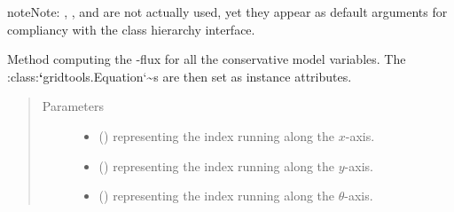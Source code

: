 \documentclass[letterpaper,10pt,english]{sphinxmanual}
\begin{document}
\begin{fulllineitems}
\begin{fulllineitems}
\begin{quote}
\begin{description}
\begin{itemize}
\end{itemize}

\end{description}\end{quote}

\begin{sphinxadmonition}{note}{Note:}
, , and  are not actually used, yet they appear
as default arguments for compliancy with the class hierarchy interface.
\end{sphinxadmonition}

\end{fulllineitems}


\begin{fulllineitems}
\label{\detokenize{api:dycore.flux_isentropic_upwind.FluxIsentropicUpwind._compute_vertical_fluxes}}
Method computing the -flux
for all the conservative model variables.
The :class:{\color{red}\bfseries{}{}`}gridtools.Equation{}`\textasciitilde{}s are then set as instance attributes.
\begin{quote}\begin{description}
\item[{Parameters}] \leavevmode\begin{itemize}
\item {} 
 () \textendash{}  representing the index running along the \(x\)-axis.

\item {} 
 () \textendash{}  representing the index running along the \(y\)-axis.

\item {} 
 () \textendash{}  representing the index running along the \(\theta\)-axis.


\end{itemize}
\end{description}
\end{quote}
\end{fulllineitems}
\end{fulllineitems}
\end{document}
